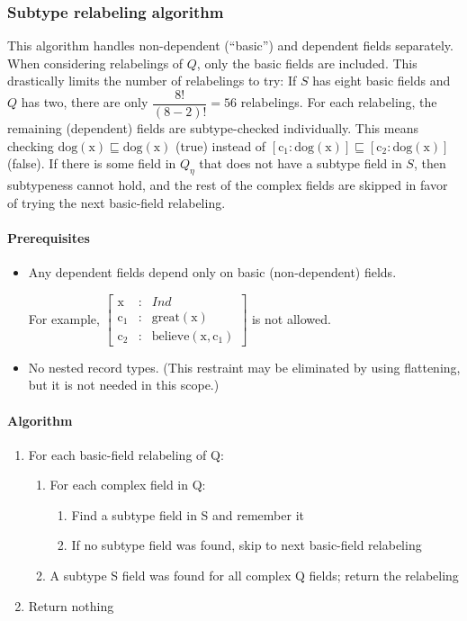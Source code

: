 \subsubsection{Subtype relabeling algorithm}

This algorithm handles non-dependent (``basic'') and dependent fields separately.
When considering relabelings of $Q$, only the basic fields are included.
This drastically limits the number of relabelings to try:
If $S$ has eight basic fields and $Q$ has two, there are only $\dfrac{8!}{(8-2)!} = 56$ relabelings.
For each relabeling, the remaining (dependent) fields are subtype-checked individually.
This means checking
$\text{dog}(\text{x}) \sqsubseteq \text{dog}(\text{x})$ (true) instead of
$[\text{c}_1 : \text{dog}(\text{x})] \sqsubseteq [\text{c}_2 : \text{dog}(\text{x})]$ (false).
If there is some field in $Q_\eta$ that does not have a subtype field in $S$, then subtypeness cannot hold, and the rest of the complex fields are skipped in favor of trying the next basic-field relabeling.

\paragraph{Prerequisites}

\begin{itemize}
\item Any dependent fields depend only on basic (non-dependent) fields.

For example, $\left[\begin{array}{rcl}
\text{x} &:& Ind \\
\text{c}_1 &:& \text{great}(\text{x}) \\
\text{c}_2 &:& \text{believe}(\text{x}, \text{c}_1)
\end{array}\right]$ is not allowed.

\item No nested record types.
(This restraint may be eliminated by using flattening, but it is not needed in this scope.)
\end{itemize}

\paragraph{Algorithm}

\begin{enumerate}
\item For each basic-field relabeling of Q:
    \begin{enumerate}
    \item For each complex field in Q:
        \begin{enumerate}
        \item Find a subtype field in S and remember it
        \item If no subtype field was found, skip to next basic-field relabeling
        \end{enumerate}
    \item A subtype S field was found for all complex Q fields; return the relabeling
    \end{enumerate}
\item Return nothing
\end{enumerate}

